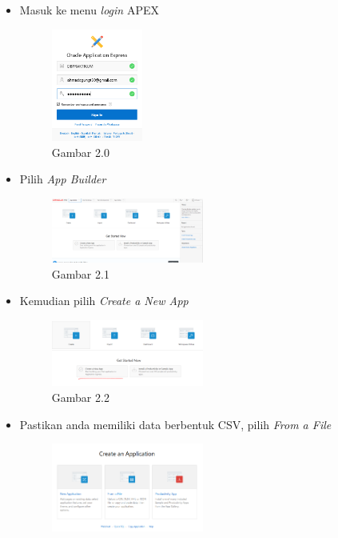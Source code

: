 \documentclass{article}
\begin{document}
        \begin{itemize}
            \item Masuk ke menu \textit{login} APEX 
                \begin{figure}[ht]
                    \centerline{\includegraphics[width=3cm]{Capture7.PNG}}
                    \caption{Gambar 2.0}
                \end{figure}
            \newpage
            \item Pilih \textit{App Builder}
                \begin{figure}[ht]
                    \centerline{\includegraphics[width=5cm]{Capture8.PNG}}
                    \caption{Gambar 2.1}
                \end{figure}
            \item Kemudian pilih \textit{Create a New App} 
                \begin{figure}[ht]
                    \centerline{\includegraphics[width=5cm]{Capture9.PNG}}
                    \caption{Gambar 2.2}
                \end{figure}
            \item Pastikan anda memiliki data berbentuk CSV, pilih \textit{From a File} 
                \begin{figure}[ht]
                    \centerline{\includegraphics[width=5cm]{Capture10.PNG}}

\end{figure}
\end{itemize}
\end{document}
